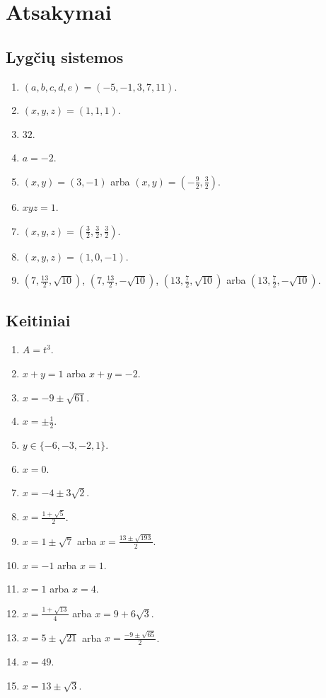 \documentclass[11pt,a4paper]{scrartcl}
\begin{document}
\section{Atsakymai}

\subsection{Lygčių sistemos}

\begin{enumerate}
    \renewcommand{\labelenumi}{\textbf{\theenumi.}}

    \item $(a,b,c,d,e)=(-5,-1,3,7,11)$.
    \item $(x,y,z)=(1,1,1)$.
    \item $32$.
    \item $a=-2$.
    \item $(x,y)=(3,-1)$ arba $(x,y)=\left(-\frac92,\frac32\right)$.
    \item $xyz=1$.
    \item $(x,y,z)=\left(\frac32,\frac32,\frac32\right)$.
    \item $(x,y,z)=(1,0,-1)$.
    \item $\left(7,\frac{13}{2},\sqrt{10}\right)$, $\left(7,\frac{13}{2},-\sqrt{10}\right)$, $\left(13,\frac72,\sqrt{10}\right)$ arba $\left(13,\frac72,-\sqrt{10}\right)$.

\end{enumerate}


\subsection{Keitiniai}

\begin{enumerate}
    \renewcommand{\labelenumi}{\textbf{\theenumi.}}

    \item $A=t^3$.
    \item $x+y=1$ arba $x+y=-2$.
    \item $x=-9\pm\sqrt{61}$.
    \item $x=\pm\frac12$.
    \item $y\in\{-6,-3,-2,1\}$.
    \item $x=0$.
    \item $x=-4\pm3\sqrt2$.
    \item $x=\frac{1+\sqrt5}{2}$.
    \item $x=1\pm\sqrt7$ arba $x=\frac{13\pm\sqrt{193}}{2}$.
    \item $x=-1$ arba $x=1$.
    \item $x=1$ arba $x=4$.
    \item $x=\frac{1+\sqrt{13}}{4}$ arba $x=9+6\sqrt3$.
    \item $x=5\pm\sqrt{21}$ arba $x=\frac{-9\pm\sqrt{65}}{2}$.
    \item $x=49$.
    \item $x=13\pm\sqrt3$.

\end{enumerate}
\end{document}

